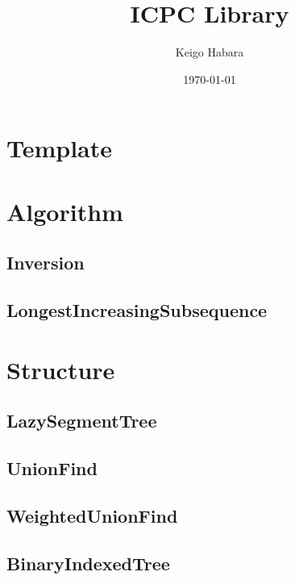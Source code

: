 \documentclass[titlepage, landscape, a4paper, twocolumn, 10pt]{ujarticle}
\begin{document}
\title{ICPC Library}
\author{Keigo Habara}
\date{\today}

\maketitle


\section{Template}




\section{Algorithm}

\subsection{Inversion}


\subsection{LongestIncreasingSubsequence}



\section{Structure}

\subsection{LazySegmentTree}


\subsection{UnionFind}


\subsection{WeightedUnionFind}


\subsection{BinaryIndexedTree}

\end{document}
